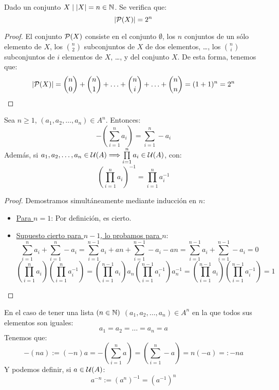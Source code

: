 \begin{prop}
    Dado un conjunto $X \mid |X|=n\in \mathbb N$. Se verifica que:
    $$|\mathcal{P}(X)| = 2^n$$
\end{prop}
\begin{proof}
    El conjunto $\mathcal{P}(X)$ consiste en el conjunto $\emptyset$, los $n$ conjuntos de un sólo elemento de $X$, los $\binom{n}{2}$ subconjuntos de $X$ de dos elementos, \ldots, los $\binom{n}{i}$ subconjuntos de $i$ elementos de $X$,
    \ldots, y del conjunto $X$. De esta forma, tenemos que:
    $$|\mathcal{P}(X)| = \binom{n}{0} + \binom{n}{1} + \ldots + \binom{n}{i} + \ldots + \binom{n}{n} = (1+1)^n = 2^n$$
\end{proof}

\begin{prop}
    Sea $n \geq 1$, $(a_1, a_2, \ldots, a_n) \in A^n$. Entonces:
    $$-\left( \sum_{i=1}^n a_i \right) = \sum_{i=1}^n -a_i $$
    Además, si $a_1, a_2, \ldots, a_n \in \mathcal{U}(A) \Longrightarrow \prod\limits_{i=1}^n a_i \in \mathcal{U}(A)$, con:
    $$\left(\prod\limits_{i=1}^n a_i\right)^{-1} = \prod_{i=1}^n a_i^{-1}$$
\end{prop}
\begin{proof}
    Demostramos simultáneamente mediante inducción en $n$:
    \begin{itemize}
        \item \underline{Para $n=1$}: Por definición, es cierto.
        \item \underline{Supuesto cierto para $n-1$, lo probamos para $n$}:
        $$\sum_{i=1}^n a_i + \sum_{i=1}^n -a_i = \sum_{i=1}^{n-1} a_i + an + \sum_{i=1}^{n-1} -a_i -an = \sum_{i=1}^{n-1}a_i  + \sum_{i=1}^{n-1}-a_i = 0$$
        $$\left(\prod\limits_{i=1}^n a_i\right)\left(\prod\limits_{i=1}^n a_i^{-1}\right) =
        \left(\prod\limits_{i=1}^{n-1} a_i\right)a_n \left(\prod\limits_{i=1}^{n-1} a_i^{-1}\right)a_n^{-1} =
        \left(\prod\limits_{i=1}^{n-1} a_i\right) \left(\prod\limits_{i=1}^{n-1} a_i^{-1}\right) = 1$$
    \end{itemize}
\end{proof}


En el caso de tener una lista $(n\in \mathbb N)$ $(a_1, a_2, \ldots, a_n) \in A^n$ en la que todos sus elementos son iguales:
$$a_1 = a_2 = \ldots = a_n = a$$
Tenemos que:
$$-(na) := (-n)a = -\left(\sum_{i=1}^n a\right) = \left(\sum_{i=1}^n -a\right) = n(-a) =: -na$$
Y podemos definir, si $a \in \mathcal{U}(A)$:
$$a^{-n} := (a^n)^{-1} = (a^{-1})^n$$

